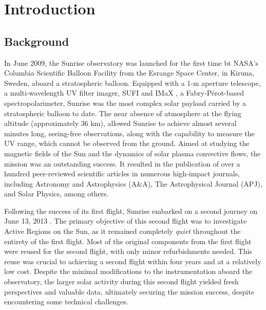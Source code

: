 \chapter{Introduction}

\section{Background}

In June 2009, the Sunrise observatory was launched for the first time \citep{SunriseI} bt NASA's Columbia Scientific Balloon Facility from the Esrange Space Center, in Kiruna, Sweden, aboard a stratospheric balloon. Equipped with a 1-m aperture telescope, a multi-wavelength UV filter imager, SUFI \citep{SUFI} and IMaX \citep{IMaX}, a Fabry-Pérot-based spectropolarimeter, Sunrise was the most complex solar payload carried by a stratospheric balloon to date. The near absence of atmosphere at the flying altitude (approximately 36 km), allowed Sunrise to achieve almost several minutes long, seeing-free observations, along with the capability to measure the UV range, which cannot be observed from the ground. Aimed at studying the magnetic fields of the Sun and the dynamics of solar plasma convective flows, the mission was an outstanding success. It resulted in the publication of over a hundred peer-reviewed scientific articles in numerous high-impact journals, including Astronomy and Astrophysics (A\&A), The Astrophysical Journal (APJ), and Solar Physics, among others.

Following the success of its first flight, Sunrise embarked on a second journey  on June 13, 2013 \citep{SunriseII}. The primary objective of this second flight was to investigate Active Regions on the Sun, as it remained completely \textit{quiet} throughout the entirety of the first flight. Most of the original components from the first flight were reused for the second flight, with only minor refurbishments needed. This reuse was crucial to achieving a second flight within four years and at a relatively low cost. Despite the minimal modifications to the instrumentation aboard the observatory, the larger solar activity during this second flight yielded fresh perspectives and valuable data, ultimately securing the mission success, despite encountering some technical challenges.

